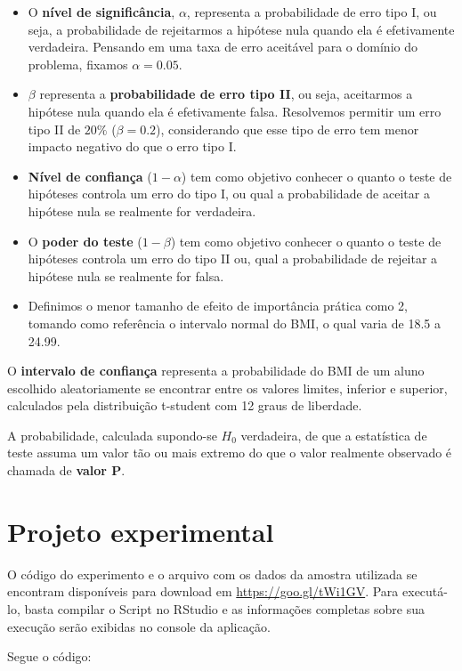 \documentclass[12pt, a4paper]{article}
\begin{document}
\begin{itemize}
\item O \textbf{nível de significância}, $\alpha$, representa a probabilidade de erro tipo I, ou seja, a probabilidade de rejeitarmos a hipótese nula quando ela é efetivamente verdadeira. Pensando em uma taxa de erro aceitável para o domínio do problema, fixamos $\alpha = 0.05$.
\item $\beta$ representa a \textbf{probabilidade de erro tipo II}, ou seja, aceitarmos a hipótese nula quando ela é efetivamente falsa. Resolvemos permitir um erro tipo II de $20\%$ ($\beta = 0.2$), considerando que esse tipo de erro tem menor impacto negativo do que o erro tipo I.
\item \textbf{Nível de confiança} ($1 - \alpha$) tem como objetivo conhecer o quanto o teste de hipóteses controla um erro do tipo I, ou qual a probabilidade de aceitar a hipótese nula se realmente for verdadeira. 
\item O \textbf{poder do teste} ($1 - \beta$) tem como objetivo conhecer o quanto o teste de hipóteses controla um erro do tipo II ou, qual a probabilidade de rejeitar a hipótese nula se realmente for falsa.
\item Definimos o menor tamanho de efeito de importância prática como 2, tomando como referência o intervalo normal do BMI, o qual varia de 18.5 a 24.99.
\end{itemize}

\par O \textbf{intervalo de confiança} representa a probabilidade do BMI de um aluno escolhido aleatoriamente se encontrar entre os valores limites, inferior e superior, calculados pela distribuição t-student com 12 graus de liberdade.
\par A probabilidade, calculada supondo-se $H_{0}$ verdadeira, de que a estatística de teste assuma um valor tão ou mais extremo do que o valor realmente observado é chamada de \textbf{valor P}.

\section{Projeto experimental}
\label{sec:projeto-experimental}
O código do experimento e o arquivo com os dados da amostra utilizada se encontram disponíveis para download em \url{https://goo.gl/tWi1GV}. Para executá-lo, basta compilar o Script no RStudio e as informações completas sobre sua execução serão exibidas no console da aplicação.
\par Segue o código:
\end{document}
